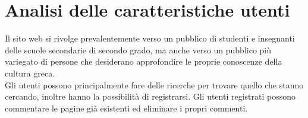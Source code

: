 \section{Analisi delle caratteristiche utenti}
Il sito web si rivolge prevalentemente verso un pubblico di studenti e insegnanti delle scuole secondarie di secondo grado, ma anche verso un pubblico più variegato di persone che desiderano approfondire le proprie conoscenze della cultura greca.\\
Gli utenti possono principalmente fare delle ricerche per trovare quello che stanno cercando, inoltre hanno la possibilità di registrarsi. Gli utenti registrati possono commentare le pagine già esistenti ed eliminare i propri commenti.